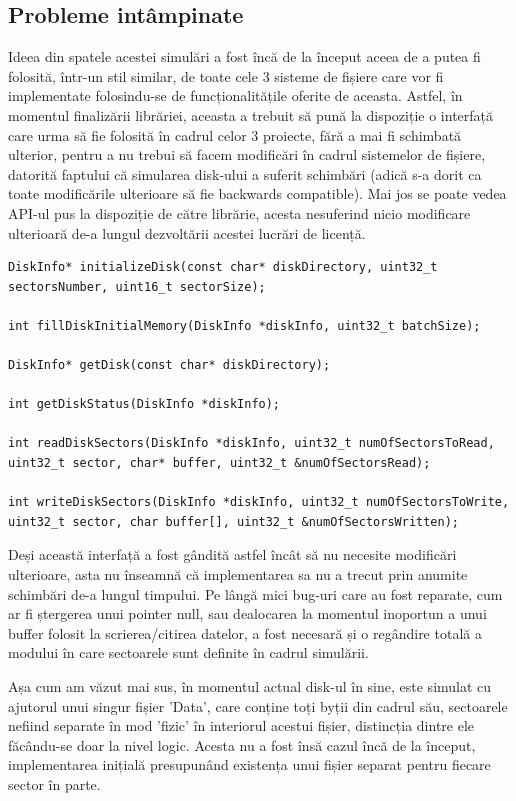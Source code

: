 \subsection{Probleme intâmpinate}

Ideea din spatele acestei simulări a fost încă de la început aceea de a putea fi folosită, într-un stil similar, de toate cele 3 sisteme de fișiere care vor fi implementate folosindu-se de funcționalitățile oferite de aceasta. Astfel, în momentul finalizării librăriei, aceasta a trebuit să pună la dispoziție o interfață care urma să fie folosită în cadrul celor 3 proiecte, fără a mai fi schimbată ulterior, pentru a nu trebui să facem modificări în cadrul sistemelor de fișiere, datorită faptului că simularea disk-ului a suferit schimbări (adică s-a dorit ca toate modificările ulterioare să fie backwards compatible). Mai jos se poate vedea API-ul pus la dispoziție de către  librărie, acesta nesuferind nicio modificare ulterioară de-a lungul dezvoltării acestei lucrări de licență.

\bigskip

\lstset{style=code-snyppet-style}
\begin{lstlisting}
DiskInfo* initializeDisk(const char* diskDirectory, uint32_t sectorsNumber, uint16_t sectorSize);

int fillDiskInitialMemory(DiskInfo *diskInfo, uint32_t batchSize);

DiskInfo* getDisk(const char* diskDirectory);

int getDiskStatus(DiskInfo *diskInfo);

int readDiskSectors(DiskInfo *diskInfo, uint32_t numOfSectorsToRead, uint32_t sector, char* buffer, uint32_t &numOfSectorsRead);

int writeDiskSectors(DiskInfo *diskInfo, uint32_t numOfSectorsToWrite, uint32_t sector, char buffer[], uint32_t &numOfSectorsWritten);
\end{lstlisting}

\bigskip

Deși această interfață a fost gândită astfel încât să nu necesite modificări ulterioare, asta nu înseamnă că implementarea sa nu a trecut prin anumite schimbări de-a lungul timpului. Pe lângă mici bug-uri care au fost reparate, cum ar fi ștergerea unui pointer null, sau dealocarea la momentul inoportun a unui buffer folosit la scrierea/citirea datelor, a fost necesară și o regândire totală a modului în care sectoarele sunt definite în cadrul simulării.

Așa cum am văzut mai sus, în momentul actual disk-ul în sine, este simulat cu ajutorul unui singur fișier 'Data', care conține toți byții din cadrul său, sectoarele nefiind separate în mod 'fizic' în interiorul acestui fișier, distincția dintre ele făcându-se doar la nivel logic. Acesta nu a fost însă cazul încă de la început, implementarea inițială presupunând existența unui fișier separat pentru fiecare sector în parte.

